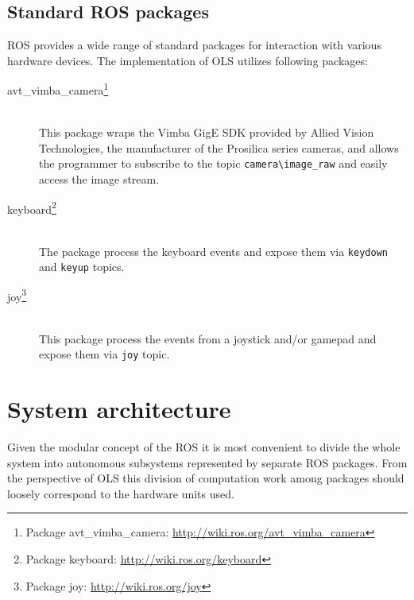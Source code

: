 
\subsection{Standard ROS packages}

ROS provides a wide range of standard packages for interaction with various hardware devices. The implementation of OLS utilizes following packages:

\begin{description}
	\item[avt\_vimba\_camera\footnote{Package avt\_vimba\_camera: \url{http://wiki.ros.org/avt_vimba_camera}}] \hfill \\
	This package wraps the Vimba GigE SDK provided by Allied Vision Technologies, the manufacturer of the Prosilica series cameras, and allows the programmer to subscribe to the topic \texttt{camera\textbackslash image\_raw} and easily access the image stream.
	
	\item[keyboard\footnote{Package keyboard: \url{http://wiki.ros.org/keyboard}}] \hfill \\
	The package process the keyboard events and expose them via \texttt{keydown} and \texttt{keyup} topics.
	
	\item[joy\footnote{Package joy: \url{http://wiki.ros.org/joy}}] \hfill \\
	This package process the events from a joystick and/or gamepad and expose them via \texttt{joy} topic.
	
\end{description}
	

\section{System architecture}

Given the modular concept of the ROS it is most convenient to divide the whole system into autonomous subsystems represented by separate ROS packages. From the perspective of OLS this division of computation work among packages should loosely correspond to the hardware units used.

